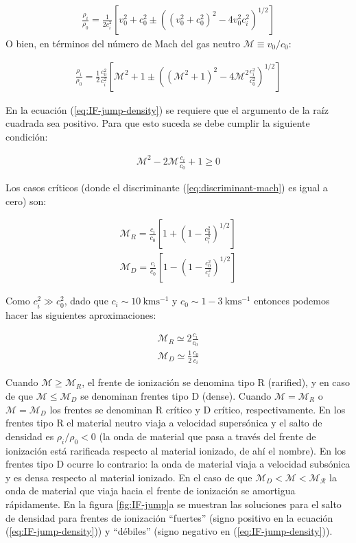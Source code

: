 \begin{align}
  \frac{\rho_i}{\rho_0} = \frac{1}{2c^2_i}\left[v^2_0 + c^2_0 \pm \left(\left(v^2_0 + c^2_0\right)^2 -4v^2_0c^2_i\right)^{1/2}\right]
\end{align}
O bien, en términos del número de Mach del gas neutro $\mathcal{M}\equiv v_0/c_0$:

\begin{align}
    \frac{\rho_i}{\rho_0} = \frac{1}{2}\frac{c^2_0}{c^2_i}\left[\mathcal{M}^2 + 1 \pm \left(\left(\mathcal{M}^2 + 1\right)^2 -4\mathcal{M}^2\frac{c^2_i}{c^2_0}\right)^{1/2}\right] \label{eq:IF-jump-density}
\end{align}

En la ecuación (\ref{eq:IF-jump-density}) se requiere que el argumento de la raíz cuadrada sea positivo. Para que esto suceda se debe cumplir la siguiente condición:

\begin{align}
  \mathcal{M}^2 - 2\mathcal{M}\frac{c_i}{c_0} + 1 \geq 0 \label{eq:discriminant-mach}
\end{align}

Los casos críticos (donde el discriminante (\ref{eq:discriminant-mach}) es igual a cero) son:

\begin{align}
  \mathcal{M}_R = \frac{c_i}{c_0}\left[1 + \left(1 - \frac{c^2_0}{c^2_i}\right)^{1/2}\right] \\
  \mathcal{M}_D = \frac{c_i}{c_0}\left[1 - \left(1 - \frac{c^2_0}{c^2_i}\right)^{1/2}\right]
\end{align}

Como $c^2_i \gg c^2_0$, dado que $c_i \sim 10\mathrm{~kms^{-1}}$ y $c_0 \sim 1-3\mathrm{~kms^{-1}}$ entonces podemos hacer las siguientes aproximaciones:

\begin{align}
  \mathcal{M}_R \simeq 2\frac{c_i}{c_0} \\
  \mathcal{M}_D \simeq \frac{1}{2}\frac{c_0}{c_i}
\end{align}

Cuando $\mathcal{M} \geq \mathcal{M}_R$, el frente de ionización se denomina tipo R (rarified), y en caso de que $\mathcal{M} \leq \mathcal{M}_D$ se denominan frentes tipo D (dense). Cuando $\mathcal{M} = \mathcal{M}_R$ o $\mathcal{M} = \mathcal{M}_D$ los frentes se denominan R crítico y D crítico, respectivamente. En los frentes tipo R el material neutro viaja a velocidad supersónica y el salto de densidad es $\rho_i/\rho_0 < 0$ (la onda de material que pasa a través del frente de ionización está rarificada respecto al material ionizado, de ahí el nombre). En los frentes tipo D ocurre lo contrario: la onda de material viaja a velocidad subsónica y es densa respecto al material ionizado. En el caso de que $\mathcal{M}_D < \mathcal{M} < \mathcal{M_R}$ la onda de material que viaja hacia el frente de ionización se amortigua rápidamente. En la figura \ref{fig:IF-jump}a se muestran las soluciones para el salto de densidad para frentes de ionización ``fuertes'' (signo positivo en la ecuación (\ref{eq:IF-jump-density})) y ``débiles'' (signo negativo en (\ref{eq:IF-jump-density})).

